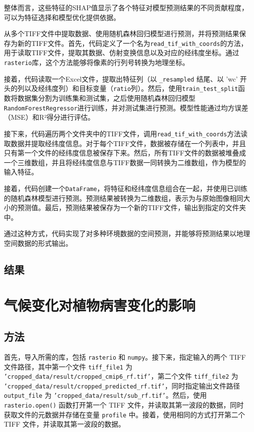 \documentclass[AutoFakeBold]{LZUThesis-PgD&PhD}
\begin{document}
整体而言，这些特征的SHAP值显示了各个特征对模型预测结果的不同贡献程度，可以为特征选择和模型优化提供依据。


从多个TIFF文件中提取数据、使用随机森林回归模型进行预测，并将预测结果保存为新的TIFF文件。首先，代码定义了一个名为\texttt{read\_tif\_with\_coords}的方法，用于读取TIFF文件，提取其数据、仿射变换信息以及对应的经纬度坐标。通过\texttt{rasterio}库，这个方法能够将像素的行列号转换为地理坐标。

接着，代码读取一个Excel文件，提取出特征列（以 \texttt{\_resampled} 结尾、以 'wc' 开头的列以及经纬度列）和目标变量（\texttt{ratio}列）。然后，使用\texttt{train\_test\_split}函数将数据集分割为训练集和测试集，之后使用随机森林回归模型\texttt{RandomForestRegressor}进行训练，并对测试集进行预测。模型性能通过均方误差（MSE）和R²得分进行评估。

接下来，代码遍历两个文件夹中的TIFF文件，调用\texttt{read\_tif\_with\_coords}方法读取数据并提取经纬度信息。对于每个TIFF文件，数据被存储在一个列表中，并且只有第一个文件的经纬度信息被保存下来。然后，所有TIFF文件的数据被堆叠成一个三维数组，并且将经纬度信息与TIFF数据一同转换为二维数组，作为模型的输入特征。

接着，代码创建一个\texttt{DataFrame}，将特征和经纬度信息组合在一起，并使用已训练的随机森林模型进行预测。预测结果被转换为二维数组，表示为与原始图像相同大小的预测值。最后，预测结果被保存为一个新的TIFF文件，输出到指定的文件夹中。

通过这种方式，代码实现了对多种环境数据的空间预测，并能够将预测结果以地理空间数据的形式输出。
\subsection{结果}



\section{气候变化对植物病害变化的影响}
\subsection{方法}
首先，导入所需的库，包括 \texttt{rasterio} 和 \texttt{numpy}。接下来，指定输入的两个 TIFF 文件路径，其中第一个文件 \texttt{tiff\_file1} 为 \texttt{'cropped\_data/result/cropped\_cmip6\_rf.tif'}，第二个文件 \texttt{tiff\_file2} 为 \texttt{'cropped\_data/result/cropped\_predicted\_rf.tif'}，同时指定输出文件路径 \texttt{output\_file} 为 \texttt{'cropped\_data/result/sub\_rf.tif'}。然后，使用 \texttt{rasterio.open()} 函数打开第一个 TIFF 文件，并读取其第一波段的数据，同时获取文件的元数据并存储在变量 \texttt{profile} 中。接着，使用相同的方式打开第二个 TIFF 文件，并读取其第一波段的数据。
\end{document}
